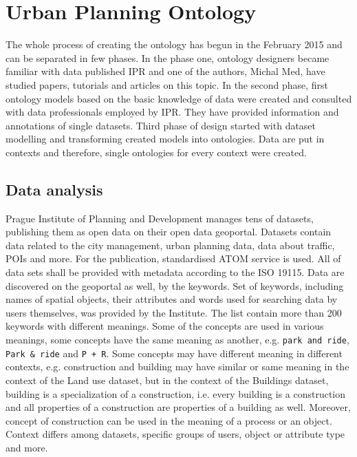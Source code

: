 \documentclass{lncs-template/llncs}
\begin{document}
\section{Urban Planning Ontology}\label{sec:ontology}


The whole process of creating the ontology has begun in the February 2015 and can be separated in few phases. In the phase one, ontology designers became familiar with data published IPR and one of the authors, Michal Med, have studied papers, tutorials and articles on this topic. In the second phase, first ontology models based on the basic knowledge of data were created and consulted with data professionals employed by IPR. They have provided information and annotations of single datasets. Third phase of design started with dataset modelling and transforming created models into ontologies. Data are put in contexts and therefore, single ontologies for every context were created.


\subsection{Data analysis}\label{sec:analysis}
Prague Institute of Planning and Development manages tens of datasets, publishing them as open data on their open data geoportal. Datasets contain data related to the city management, urban planning data, data about traffic, POIs and more. For the publication, standardised ATOM service \cite{} is used. All of data sets shall be provided with metadata according to the ISO 19115\cite{}. Data are discovered on the geoportal as well, by the keywords. Set of keywords, including names of spatial objects, their attributes and words used for searching data by users themselves, was provided by the Institute. The list contain more than 200 keywords with different meanings. Some of the concepts are used in various meanings, some concepts have the same meaning as another, e.g. \texttt{park and ride}, \texttt{Park \& ride} and \texttt{P + R}. Some concepts may have different meaning in different contexts, e.g. construction and building may have similar or same meaning in the context of the Land use dataset, but in the context of the Buildings dataset, building is a specialization\cite{} of a construction, i.e. every building is a construction and all properties of a construction are properties of a building as well. Moreover, concept of construction can be used in the meaning of a process or an object. Context differs among datasets, specific groups of users, object or attribute type and more.
\end{document}
